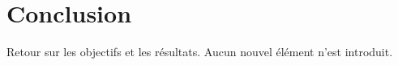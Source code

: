 \documentclass[../main.tex]{subfiles}
\begin{document}

 
\chapter{Conclusion}
 
Retour sur les objectifs et les résultats.
Aucun nouvel élément n'est introduit.
\end{document}
